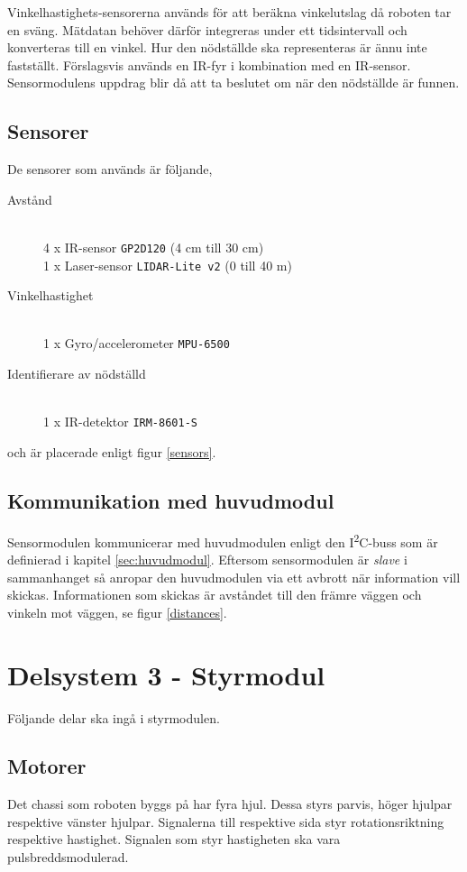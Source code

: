 \documentclass[11pt]{article}
\begin{document}
\begin{flushleft}
Vinkelhastighets-sensorerna används för att beräkna vinkelutslag då roboten tar en sväng. Mätdatan behöver därför integreras under ett tidsintervall och konverteras till en vinkel. Hur den nödställde ska representeras är ännu inte fastställt. Förslagsvis används en IR-fyr i kombination med en IR-sensor. Sensormodulens uppdrag blir då att ta beslutet om när den nödställde är funnen.


\subsection{Sensorer}
De sensorer som används är följande,
\begin{description}
	\item[Avstånd] \hfill \\
	4 x IR-sensor \verb+GP2D120+ (4 cm till 30 cm) \\
	1 x Laser-sensor \verb+LIDAR-Lite v2+ (0 till 40 m) \\
	\item[Vinkelhastighet] \hfill \\
	1 x Gyro/accelerometer \verb+MPU-6500+ 
	\item[Identifierare av nödställd] \hfill \\
	1 x IR-detektor \verb+IRM-8601-S+
\end{description}
och är placerade enligt figur \ref{sensors}.  

\subsection{Kommunikation med huvudmodul}
Sensormodulen kommunicerar med huvudmodulen enligt den I\textsuperscript{2}C-buss som är definierad i kapitel \ref{sec:huvudmodul}. Eftersom sensormodulen är \emph{slave} i sammanhanget så anropar den huvudmodulen via ett avbrott när information vill skickas. Informationen som skickas är avståndet till den främre väggen och vinkeln mot väggen, se figur \ref{distances}. 
\pagebreak
\section{Delsystem 3 - Styrmodul}
Följande delar ska ingå i styrmodulen.
\subsection{Motorer}

Det chassi som roboten byggs på har fyra hjul. Dessa styrs parvis, höger hjulpar respektive vänster hjulpar. Signalerna till respektive sida styr rotationsriktning respektive hastighet. Signalen som styr hastigheten ska vara pulsbreddsmodulerad.

\end{flushleft}
\end{document}
